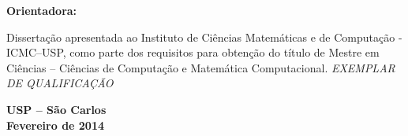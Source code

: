 \begin{titlepage}
\begin{center}
{\textbf{\textit{ \autor }}}
% 
\vspace*{1.5cm}


{\bf Orientadora:}  {\textbf{\textit{\orientador}}}

\end{center}

\vspace*{1.5cm}

\begin{flushright}
	\begin{minipage}{9.5cm}
	Dissertação apresentada ao Instituto de Ciências 
	Matemáticas e de Computação - ICMC--USP, como 
	parte dos requisitos para obtenção do título de Mestre
	em Ciências -- Ciências de Computação e Matemática
	Computacional. {\it EXEMPLAR DE QUALIFICAÇÃO}
	\end{minipage}
	
\end{flushright}

\vspace*{1.5cm}
\begin{center}
\textbf{USP -- São Carlos\\Fevereiro de 2014\\}
\end{center}

\newpage



\end{titlepage}
